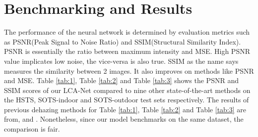 \documentclass[conference]{IEEEtran}
\begin{document}
\section{Benchmarking and Results}
The performance of the neural network is determined by evaluation metrics such as PSNR(Peak Signal to Noise Ratio) and SSIM(Structural Similarity Index). PSNR is essentially the ratio between maximum intensity and MSE. High PSNR value implicates low noise, the vice-versa is also true. 
SSIM as the name says measures the similarity between 2 images. It also improves on methods like PSNR and MSE.
\newline
\newline
Table \ref{tab:1}, Table \ref{tab:2} and Table \ref{tab:3} shows the PSNR and SSIM scores of our LCA-Net compared to nine other state-of-the-art methods \cite{5567108, 5459251, Meng_2013_ICCV, 10.1007/978-3-319-46475-6_36, Berman_2016_CVPR, 7539399, 10.1007/978-3-319-46475-6_10, Li_2017_ICCV, 8803478} on the HSTS, SOTS-indoor and SOTS-outdoor test sets respectively. The results of previous dehazing methods for Table \ref{tab:1}, Table \ref{tab:2} and Table \ref{tab:3} are from, \cite{li2019benchmarking} and \cite{8803478}. Nonetheless, since our model benchmarks on the same dataset, the comparison is fair.
\newline
\end{document}
